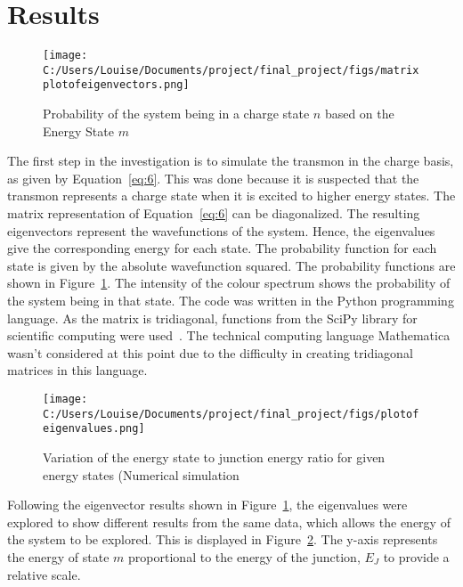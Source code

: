 \documentclass[11pt]{article}
\begin{document}
\section{Results}

\begin{figure}[ht]
\centering
\texttt{[image: C:/Users/Louise/Documents/project/final\_project/figs/matrixplotofeigenvectors.png]}
\caption{Probability of the system being in a charge state $n$ based on the Energy State $m$ }
\label{fig:graph1}
\end{figure}
The first step in the investigation is to simulate the transmon in the charge basis, as given by Equation~\ref{eq:6}. This was done because it is suspected that the transmon represents a charge state when it is excited to higher energy states. The matrix representation of Equation~\ref{eq:6} can be diagonalized. The resulting eigenvectors represent the wavefunctions of the system. Hence, the eigenvalues give the corresponding energy for each state. The probability function for each state is given by the absolute wavefunction squared. The probability functions are shown in Figure~\ref{fig:graph1}. The intensity of the colour spectrum shows the probability of the system being in that state. The code was written in the Python programming language. As the matrix is tridiagonal, functions from the SciPy library for scientific computing were used~\cite{jonesSciPyOpenSource2001}. The technical computing language Mathematica wasn't considered at this point due to the difficulty in creating tridiagonal matrices in this language.
\begin{figure}[ht]
\centering
\texttt{[image: C:/Users/Louise/Documents/project/final\_project/figs/plotofeigenvalues.png]}
\caption{Variation of the  energy state to junction energy ratio for given energy states (Numerical simulation}
\label{fig:graph2}
\end{figure}
Following the eigenvector results shown in Figure~\ref{fig:graph1}, the eigenvalues were explored to show different results from the same data, which allows the energy of the system to be explored. This is displayed in Figure~\ref{fig:graph2}. The y-axis represents the energy of state $m$ proportional to the energy of the junction, $E_J$ to provide a relative scale.
\end{document}
